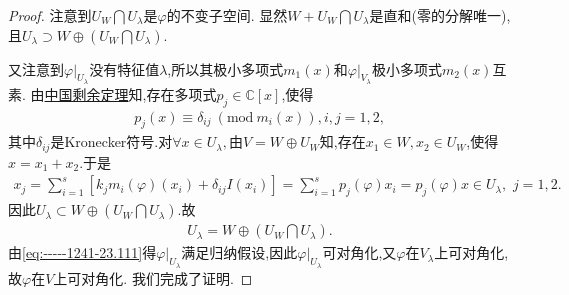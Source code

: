 \documentclass[../../main.tex]{subfiles}%
\begin{document}
\begin{proof}
注意到$U_W \bigcap U_\lambda$是$\varphi$的不变子空间. 显然$W + U_W \bigcap U_\lambda$是直和(零的分解唯一),且$U_\lambda \supset W \oplus (U_W \bigcap U_\lambda). $

又注意到$\varphi|_{U_\lambda}$没有特征值$\lambda$,所以其极小多项式$m_1(x)$和$\varphi|_{V_\lambda}$极小多项式$m_2(x)$互素. 由\hyperref[theorem:中国剩余定理(多项式版)]{中国剩余定理}知,存在多项式$p_j\in \mathbb{C}[x]$,使得
\begin{align*}
p_j(x) \equiv \delta_{ij} \ (\text{mod} \ m_i(x)), i,j = 1,2, 
\end{align*}
其中$\delta_{ij}$是Kronecker符号.对$\forall x\in U_{\lambda},$由$V=W\oplus U_W$知,存在$x_1\in W,x_2\in U_W$,使得$x=x_1+x_2.$于是
\begin{align*}
x_j=\sum_{i=1}^s{\left[ k_jm_i\left( \varphi \right) \left( x_i \right) +\delta _{ij}I\left( x_i \right) \right]}=\sum_{i=1}^s{p_j(\varphi )x_i}=p_j(\varphi )x\in U_{\lambda},\,\,j=1,2.
\end{align*}
因此$U_{\lambda}\subset W \oplus (U_W \bigcap U_\lambda)$.故
\begin{align}
U_\lambda = W \oplus (U_W \bigcap U_\lambda). \label{eq:-----1241-23.111}
\end{align}
由\eqref{eq:-----1241-23.111}得$\varphi|_{U_\lambda}$满足归纳假设,因此$\varphi|_{U_\lambda}$可对角化,又$\varphi$在$V_{\lambda}$上可对角化,故$\varphi$在$V$上可对角化. 我们完成了证明.


\end{proof}
\end{document}
